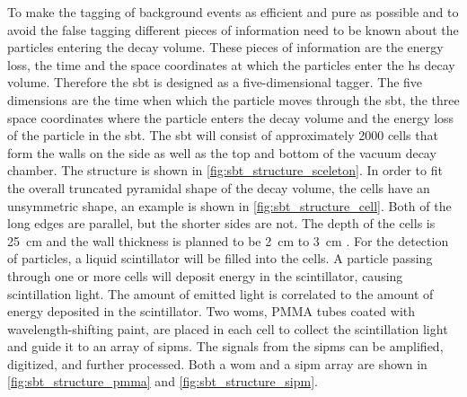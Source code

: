 To make the tagging of background events as efficient and pure as possible and to avoid the false tagging different pieces of information need to be known about the particles entering the decay volume.
These pieces of information are the energy loss, the time and the space coordinates at which the particles enter the \ac{hs} decay volume.
Therefore the \ac{sbt} is designed as a five-dimensional tagger.
The five dimensions are the time when which the particle moves through the \ac{sbt}, the three space coordinates where the particle enters the decay volume and the energy loss of the particle in the \ac{sbt}.
The \ac{sbt} will consist of approximately 2000 cells that form the walls on the side as well as the top and bottom of the vacuum decay chamber.
The structure is shown in \autoref{fig:sbt_structure_sceleton}.
In order to fit the overall truncated pyramidal shape of the decay volume, the cells have an unsymmetric shape, an example is shown in \autoref{fig:sbt_structure_cell}.
Both of the long edges are parallel, but the shorter sides are not.
The depth of the cells is \SI{25}{\centi\meter} and the wall thickness is planned to be \SI{2}{\centi\meter} to \SI{3}{\centi\meter} \cite{strucural_design}.
For the detection of particles, a liquid scintillator will be filled into the cells.
A particle passing through one or more cells will deposit energy in the scintillator, causing scintillation light.
The amount of emitted light is correlated to the amount of energy deposited in the scintillator.
Two \acp{wom}, PMMA tubes coated with wavelength-shifting paint, are placed in each cell to collect the scintillation light and guide it to an array of \acp{sipm}.
The signals from the \acp{sipm} can be amplified, digitized, and further processed.
Both a \ac{wom} and a \ac{sipm} array are shown in \autoref{fig:sbt_structure_pmma} and \autoref{fig:sbt_structure_sipm}.
